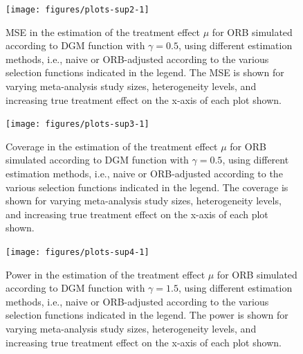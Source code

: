 \documentclass{article}\usepackage[]{graphicx}\usepackage[]{xcolor}
\begin{document}
\begin{figure}[!hbt]
\centering
\caption{MSE in the estimation of the treatment effect $\mu$ for ORB simulated according to DGM function with $\gamma=0.5$, using different estimation methods, i.e., naive or ORB-adjusted according to the various selection functions indicated in the legend. The MSE is shown for varying meta-analysis study sizes, heterogeneity levels, and increasing true treatment effect on the x-axis of each plot shown.\\[0.5em]}


{\centering \texttt{[image: figures/plots-sup2-1]} 

}



\label{MSE2}
\end{figure}




\begin{figure}[!hbt]
\centering
\caption{Coverage in the estimation of the treatment effect $\mu$ for ORB simulated according to DGM function with $\gamma=0.5$, using different estimation methods, i.e., naive or ORB-adjusted according to the various selection functions indicated in the legend. The coverage is shown for varying meta-analysis study sizes, heterogeneity levels, and increasing true treatment effect on the x-axis of each plot shown.\\[0.5em]}


{\centering \texttt{[image: figures/plots-sup3-1]} 

}



\label{Cov2}
\end{figure}


\begin{figure}[!hbt]
\centering
\caption{Power in the estimation of the treatment effect $\mu$ for ORB simulated according to DGM function with $\gamma=1.5$, using different estimation methods, i.e., naive or ORB-adjusted according to the various selection functions indicated in the legend. The power is shown for varying meta-analysis study sizes, heterogeneity levels, and increasing true treatment effect on the x-axis of each plot shown.\\[0.5em]}


{\centering \texttt{[image: figures/plots-sup4-1]} 

}



\label{Pow1}
\end{figure}
\end{document}
